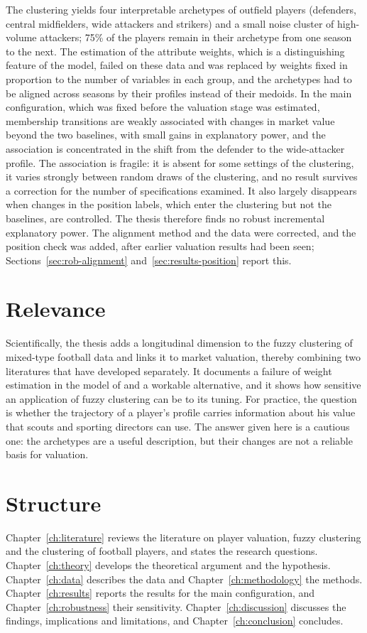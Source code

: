 The clustering yields four interpretable archetypes of outfield players (defenders, central midfielders, wide attackers and strikers) and a small noise cluster of high-volume attackers; 75\% of the players remain in their archetype from one season to the next. The estimation of the attribute weights, which is a distinguishing feature of the model, failed on these data and was replaced by weights fixed in proportion to the number of variables in each group, and the archetypes had to be aligned across seasons by their profiles instead of their medoids. In the main configuration, which was fixed before the valuation stage was estimated, membership transitions are weakly associated with changes in market value beyond the two baselines, with small gains in explanatory power, and the association is concentrated in the shift from the defender to the wide-attacker profile. The association is fragile: it is absent for some settings of the clustering, it varies strongly between random draws of the clustering, and no result survives a correction for the number of specifications examined. It also largely disappears when changes in the position labels, which enter the clustering but not the baselines, are controlled. The thesis therefore finds no robust incremental explanatory power. The alignment method and the data were corrected, and the position check was added, after earlier valuation results had been seen; Sections~\ref{sec:rob-alignment} and~\ref{sec:results-position} report this.

\section{Relevance}

Scientifically, the thesis adds a longitudinal dimension to the fuzzy clustering of mixed-type football data and links it to market valuation, thereby combining two literatures that have developed separately. It documents a failure of weight estimation in the model of  and a workable alternative, and it shows how sensitive an application of fuzzy clustering can be to its tuning. For practice, the question is whether the trajectory of a player's profile carries information about his value that scouts and sporting directors can use. The answer given here is a cautious one: the archetypes are a useful description, but their changes are not a reliable basis for valuation.

\section{Structure}

Chapter~\ref{ch:literature} reviews the literature on player valuation, fuzzy clustering and the clustering of football players, and states the research questions. Chapter~\ref{ch:theory} develops the theoretical argument and the hypothesis. Chapter~\ref{ch:data} describes the data and Chapter~\ref{ch:methodology} the methods. Chapter~\ref{ch:results} reports the results for the main configuration, and Chapter~\ref{ch:robustness} their sensitivity. Chapter~\ref{ch:discussion} discusses the findings, implications and limitations, and Chapter~\ref{ch:conclusion} concludes.
